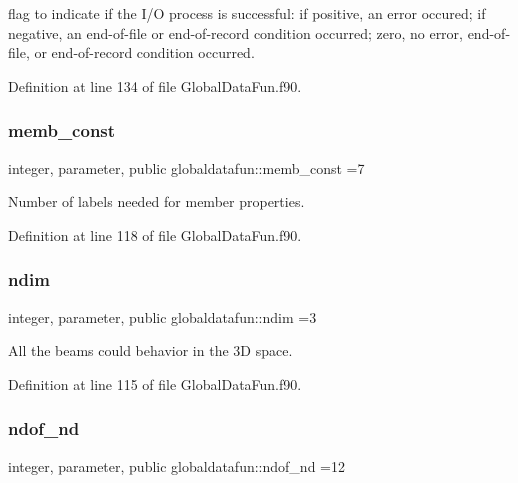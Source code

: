 flag to indicate if the I/O process is successful\+: if positive, an error occured; if negative, an end-\/of-\/file or end-\/of-\/record condition occurred; zero, no error, end-\/of-\/file, or end-\/of-\/record condition occurred. 



Definition at line 134 of file Global\+Data\+Fun.\+f90.

\mbox{\label{namespaceglobaldatafun_ae88f4c5de30b425e43d5392116dfdcda}} 
\subsubsection{\texorpdfstring{memb\+\_\+const}{memb\_const}}
{\footnotesize\ttfamily integer, parameter, public globaldatafun\+::memb\+\_\+const =7}



Number of labels needed for member properties. 



Definition at line 118 of file Global\+Data\+Fun.\+f90.

\mbox{\label{namespaceglobaldatafun_a5041a6e08575b124a458c49a76dc6d31}} 
\subsubsection{\texorpdfstring{ndim}{ndim}}
{\footnotesize\ttfamily integer, parameter, public globaldatafun\+::ndim =3}



All the beams could behavior in the 3D space. 



Definition at line 115 of file Global\+Data\+Fun.\+f90.

\mbox{\label{namespaceglobaldatafun_a44ab75808fb35a144d54fa9a6c9fe07a}} 
\subsubsection{\texorpdfstring{ndof\+\_\+nd}{ndof\_nd}}
{\footnotesize\ttfamily integer, parameter, public globaldatafun\+::ndof\+\_\+nd =12}




